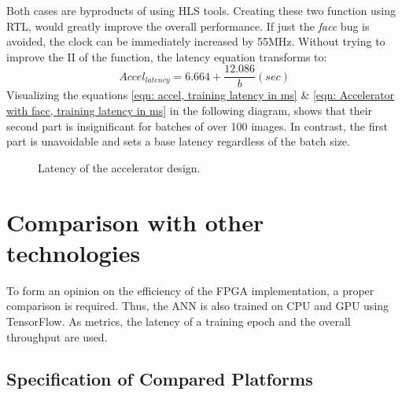 Both cases are byproducts of using HLS tools. Creating these two function using RTL, would greatly improve the overall performance. If just the \textit{facc} bug is avoided, the clock can be immediately increased by 55MHz. Without trying to improve the II of the function, the latency equation transforms to: %
\begin{equation}
    Accel_{latency} = 6.664 + \frac{ 12.086 }{b} (sec) %
    \label{eqn: Accelerator with facc, training latency in ms}
\end{equation}
Visualizing the equations \ref{eqn: accel, training latency in ms} \& \ref{eqn: Accelerator with facc, training latency in ms} in the following diagram, shows that their second part is insignificant for batches of over 100 images. In contrast, the first part is unavoidable and sets a base latency regardless of the batch size. %
\begin{figure}[H]
    \center
    \caption[Accelerator's latency per batch size]{Latency of the accelerator design.}
    \label{fig: accel latency}
\end{figure}

\section{Comparison with other technologies}
To form an opinion on the efficiency of the FPGA implementation, a proper comparison is required. Thus, the ANN is also trained on CPU and GPU using TensorFlow. As metrics, the latency of a training epoch and the overall throughput are used.

\subsection{Specification of Compared Platforms}
